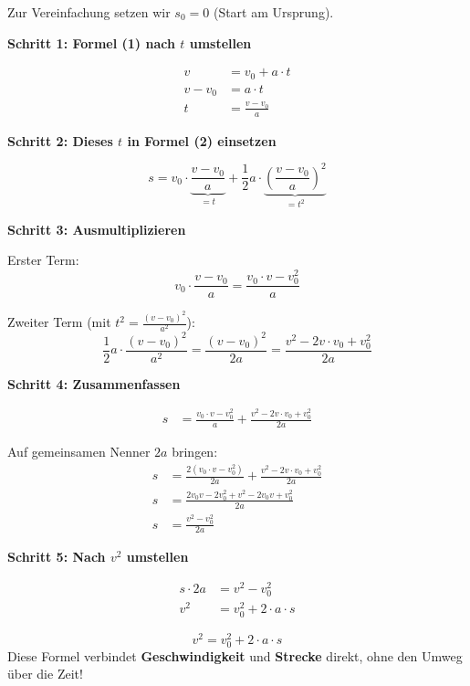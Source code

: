 \documentclass[11pt,a4paper]{article}
\begin{document}
Zur Vereinfachung setzen wir $s_0 = 0$ (Start am Ursprung).

\vspace{0.5cm}
\textbf{Schritt 1: Formel (1) nach $t$ umstellen}

\begin{align*}
v &= v_0 + a \cdot t \\[0.3em]
v - v_0 &= a \cdot t \\[0.3em]
t &= \frac{v - v_0}{a}
\end{align*}

\vspace{0.5cm}
\textbf{Schritt 2: Dieses $t$ in Formel (2) einsetzen}

\[
s = v_0 \cdot \underbrace{\frac{v - v_0}{a}}_{= t} + \frac{1}{2} a \cdot \underbrace{\left(\frac{v - v_0}{a}\right)^2}_{= t^2}
\]

\vspace{0.5cm}
\textbf{Schritt 3: Ausmultiplizieren}

Erster Term:
\[
v_0 \cdot \frac{v - v_0}{a} = \frac{v_0 \cdot v - v_0^2}{a}
\]

Zweiter Term (mit $t^2 = \frac{(v-v_0)^2}{a^2}$):
\[
\frac{1}{2} a \cdot \frac{(v - v_0)^2}{a^2} = \frac{(v - v_0)^2}{2a} = \frac{v^2 - 2v \cdot v_0 + v_0^2}{2a}
\]

\vspace{0.5cm}
\textbf{Schritt 4: Zusammenfassen}

\begin{align*}
s &= \frac{v_0 \cdot v - v_0^2}{a} + \frac{v^2 - 2v \cdot v_0 + v_0^2}{2a}
\end{align*}

Auf gemeinsamen Nenner $2a$ bringen:
\begin{align*}
s &= \frac{2(v_0 \cdot v - v_0^2)}{2a} + \frac{v^2 - 2v \cdot v_0 + v_0^2}{2a} \\[0.5em]
s &= \frac{2v_0 v - 2v_0^2 + v^2 - 2v_0 v + v_0^2}{2a} \\[0.5em]
s &= \frac{v^2 - v_0^2}{2a}
\end{align*}

\vspace{0.5cm}
\textbf{Schritt 5: Nach $v^2$ umstellen}

\begin{align*}
s \cdot 2a &= v^2 - v_0^2 \\[0.3em]
v^2 &= v_0^2 + 2 \cdot a \cdot s
\end{align*}

\begin{formelbox}
\[
\boxed{v^2 = v_0^2 + 2 \cdot a \cdot s}
\]
Diese Formel verbindet \textbf{Geschwindigkeit} und \textbf{Strecke} direkt, ohne den Umweg über die Zeit!
\end{formelbox}
\end{document}
